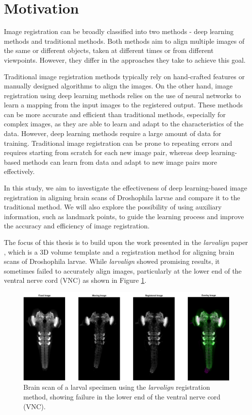 \documentclass{book}
\begin{document}
	\section{Motivation} \label{sec:motivation}
	Image registration can be broadly classified into two methods - deep learning methods and traditional methods. Both methods aim to align multiple images of the same or different objects, taken at different times or from different viewpoints. However, they differ in the approaches they take to achieve this goal.
	
	Traditional image registration methods typically rely on hand-crafted features or manually designed algorithms to align the images. On the other hand, image registration using deep learning methods relies on the use of neural networks to learn a mapping from the input images to the registered output. These methods can be more accurate and efficient than traditional methods, especially for complex images, as they are able to learn and adapt to the characteristics of the data. However, deep learning methods require a large amount of data for training. Traditional image registration can be prone to repeating errors and requires starting from scratch for each new image pair, whereas deep learning-based methods can learn from data and adapt to new image pairs more effectively.
	
	In this study, we aim to investigate the effectiveness of deep learning-based image registration in aligning brain scans of Droshophila larvae and compare it to the traditional method. We will also explore the possibility of using auxiliary information, such as landmark points, to guide the learning process and improve the accuracy and efficiency of image registration.
	
	The focus of this thesis is to build upon the work presented in the \textit{larvalign} paper \cite{larvalign}, which is a 3D volume template and a registration method for aligning brain scans of Droshophila larvae. While \textit{larvalign} showed promising results, it sometimes failed to accurately align images, particularly at the lower end of the ventral nerve cord (VNC) as shown in Figure \ref{fig:Registraion_Failure}.
	
	\begin{figure}[h!]
		\centering
		\includegraphics[width=\linewidth]{resources/motivation_fig_1.jpg}
		\caption{Brain scan of a larval specimen using the \textit{larvalign} registration method, showing failure in the lower end of the ventral nerve cord (VNC).}
		\label{fig:Registraion_Failure}
	\end{figure}
	
\end{document}
